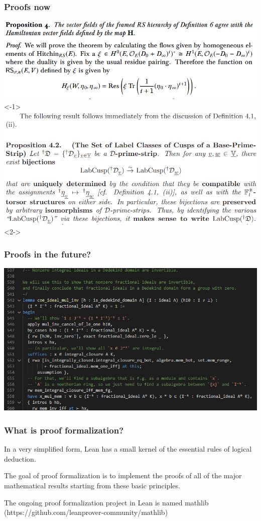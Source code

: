 \documentclass{beamer}
\begin{document}
\begin{frame}
    \frametitle{Proofs now}
    \begin{center}
        \includegraphics[scale=.4]{img/mypaper.png}<-1>
        \pause
        \includegraphics[scale=.4]{img/IUT.png}<2->
    \end{center}
\end{frame}

\begin{frame}
    \frametitle{Proofs in the future?}
    \begin{center}
        \includegraphics[scale=.5]{img/lean.png}
    \end{center}
\end{frame}

\begin{frame}
    \frametitle{What is proof formalization?}
    In a very simplified form, Lean has a small kernel of the essential rules of logical deduction.

    \pause
    \vspace{20pt}
    The goal of proof formalization is to implement the proofs of all of the major mathematical results starting from these basic principles.

    \pause
    \vspace{20pt}
    The ongoing proof formalization project in Lean is named mathlib (https://github.com/leanprover-community/mathlib)
\end{frame}
\end{document}
